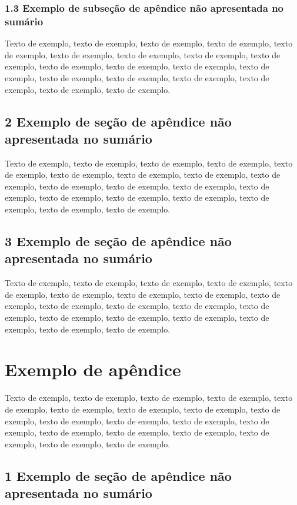 \documentclass[
	12pt,				%
	oneside,			%
	a4paper,			%
	english,			%
	brazil				%
	]{abntex2ppgsi}
\begin{document}
\begin{apendicesenv}
\subsection*{1.3 Exemplo de subseção de apêndice não apresentada no sumário}

Texto de exemplo, texto de exemplo, texto de exemplo, texto de exemplo, texto de exemplo, texto de exemplo, texto de exemplo, texto de exemplo, texto de exemplo, texto de exemplo, texto de exemplo, texto de exemplo, texto de exemplo, texto de exemplo, texto de exemplo, texto de exemplo, texto de exemplo, texto de exemplo, texto de exemplo.

\section*{2 Exemplo de seção de apêndice não apresentada no sumário}

Texto de exemplo, texto de exemplo, texto de exemplo, texto de exemplo, texto de exemplo, texto de exemplo, texto de exemplo, texto de exemplo, texto de exemplo, texto de exemplo, texto de exemplo, texto de exemplo, texto de exemplo, texto de exemplo, texto de exemplo, texto de exemplo, texto de exemplo, texto de exemplo, texto de exemplo.

\section*{3 Exemplo de seção de apêndice não apresentada no sumário}

Texto de exemplo, texto de exemplo, texto de exemplo, texto de exemplo, texto de exemplo, texto de exemplo, texto de exemplo, texto de exemplo, texto de exemplo, texto de exemplo, texto de exemplo, texto de exemplo, texto de exemplo, texto de exemplo, texto de exemplo, texto de exemplo, texto de exemplo, texto de exemplo, texto de exemplo.


\chapter{Exemplo de apêndice}

Texto de exemplo, texto de exemplo, texto de exemplo, texto de exemplo, texto de exemplo, texto de exemplo, texto de exemplo, texto de exemplo, texto de exemplo, texto de exemplo, texto de exemplo, texto de exemplo, texto de exemplo, texto de exemplo, texto de exemplo, texto de exemplo, texto de exemplo, texto de exemplo, texto de exemplo.

\section*{1 Exemplo de seção de apêndice não apresentada no sumário}


\end{apendicesenv}
\end{document}
